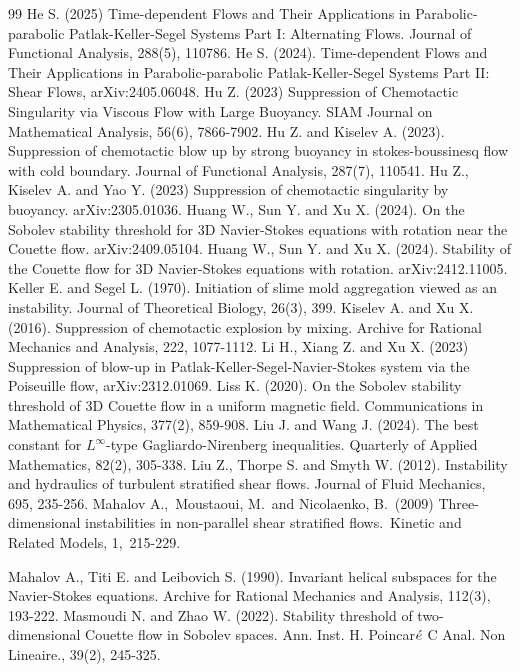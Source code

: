 \documentclass[12pt, reqno]{amsart}
\numberwithin{equation}{section}
\begin{document}
\begin{thebibliography}{99}
		He S. (2025) Time-dependent Flows and Their Applications in Parabolic-parabolic Patlak-Keller-Segel Systems Part I: Alternating Flows. Journal of Functional Analysis, 288(5), 110786.
		He S. (2024).  Time-dependent Flows and Their Applications in Parabolic-parabolic Patlak-Keller-Segel Systems Part II: Shear Flows, arXiv:2405.06048.
		 Hu Z. (2023) Suppression of Chemotactic Singularity via Viscous Flow with Large Buoyancy. SIAM Journal on Mathematical Analysis, 56(6), 7866-7902.
		Hu Z. and Kiselev A. (2023). Suppression of chemotactic blow up by strong buoyancy in stokes-boussinesq flow with cold boundary. 
		Journal of Functional Analysis, 287(7), 110541.
		 Hu Z., Kiselev A. and Yao Y. (2023) Suppression of chemotactic singularity by buoyancy. arXiv:2305.01036.
		Huang W., Sun Y. and Xu X. (2024). On the Sobolev stability threshold for 3D Navier-Stokes equations with rotation near the Couette flow. arXiv:2409.05104.
		 Huang W., Sun Y. and Xu X. (2024). Stability of the Couette flow for 3D Navier-Stokes equations with rotation. arXiv:2412.11005.
		Keller E. and Segel L. (1970). Initiation of slime mold aggregation viewed as an instability.
		Journal of Theoretical Biology, 26(3), 399.
		Kiselev A. and Xu X. (2016).
		Suppression of chemotactic explosion by mixing. Archive for Rational Mechanics and Analysis, 222, 1077-1112.
		Li H., Xiang Z. and Xu X. (2023) Suppression of blow-up in Patlak-Keller-Segel-Navier-Stokes system via the Poiseuille flow, arXiv:2312.01069.
		 Liss K. (2020). On the Sobolev stability threshold of 3D Couette flow in a uniform magnetic field. Communications in Mathematical Physics, 377(2), 859-908.
		Liu J. and Wang J. (2024). The best constant for $L^{\infty}$-type Gagliardo-Nirenberg inequalities. Quarterly of Applied Mathematics, 82(2), 305-338.
		  Liu Z., Thorpe S. and Smyth W. (2012).
		Instability and hydraulics of turbulent stratified shear flows.
		Journal of Fluid Mechanics, 695, 235-256.
		 Mahalov A., Moustaoui, M. and Nicolaenko, B. (2009) Three-dimensional instabilities in non-parallel shear stratified flows. Kinetic and Related Models, 1, 215-229.
		
		 Mahalov A., Titi E. and Leibovich S. (1990). Invariant helical subspaces for the Navier-Stokes equations. Archive for Rational Mechanics and Analysis, 112(3), 193-222.
		 Masmoudi N. and Zhao W. (2022). Stability threshold of two-dimensional Couette flow in Sobolev spaces. Ann. Inst. H. Poincar$ \acute{\rm e} $ C Anal. Non Lineaire., 39(2), 245-325.
		

\end{thebibliography}
\end{document}
